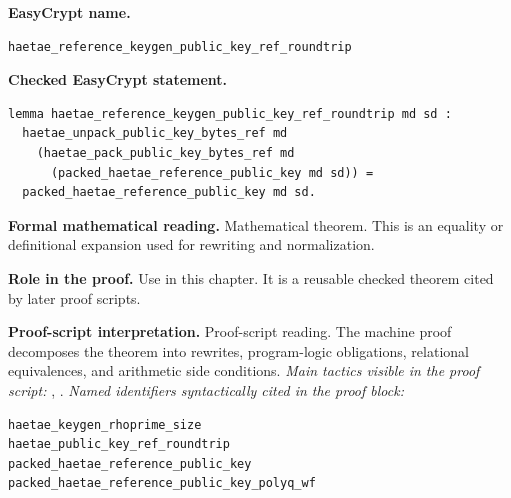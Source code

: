 \begin{formaltheorem}
\noindent\textbf{EasyCrypt name.}
\begin{lstlisting}[language=EasyCrypt,basicstyle=\ttfamily\scriptsize]
haetae_reference_keygen_public_key_ref_roundtrip
\end{lstlisting}
\noindent\textbf{Checked EasyCrypt statement.}
\begin{lstlisting}[language=EasyCrypt,basicstyle=\ttfamily\scriptsize]
lemma haetae_reference_keygen_public_key_ref_roundtrip md sd :
  haetae_unpack_public_key_bytes_ref md
    (haetae_pack_public_key_bytes_ref md
      (packed_haetae_reference_public_key md sd)) =
  packed_haetae_reference_public_key md sd.
\end{lstlisting}
\noindent\textbf{Formal mathematical reading.}
Mathematical theorem. This is an equality or definitional expansion used for rewriting and normalization.

\noindent\textbf{Role in the proof.}
Use in this chapter. It is a reusable checked theorem cited by later proof scripts.

\noindent\textbf{Proof-script interpretation.}
Proof-script reading. The machine proof decomposes the theorem into rewrites, program-logic obligations, relational equivalences, and arithmetic side conditions.
\emph{Main tactics visible in the proof script:} , .
\emph{Named identifiers syntactically cited in the proof block:}
\begin{lstlisting}[language=EasyCrypt,basicstyle=\ttfamily\scriptsize]
haetae_keygen_rhoprime_size
haetae_public_key_ref_roundtrip
packed_haetae_reference_public_key
packed_haetae_reference_public_key_polyq_wf
\end{lstlisting}

\end{formaltheorem}

